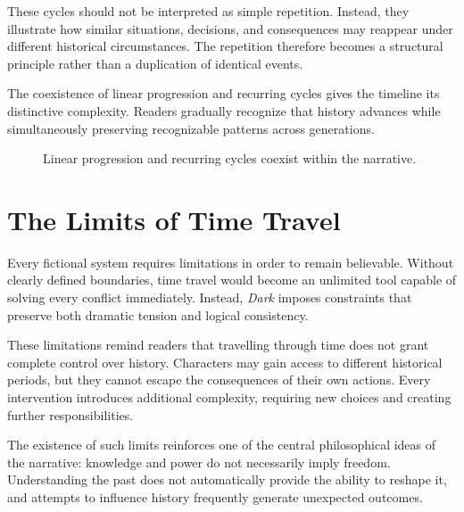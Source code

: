 \documentclass[12pt,oneside,openany]{book}
\begin{document}
These cycles should not be interpreted as simple repetition. Instead, they
illustrate how similar situations, decisions, and consequences may reappear
under different historical circumstances. The repetition therefore becomes a
structural principle rather than a duplication of identical events.

The coexistence of linear progression and recurring cycles gives the timeline
its distinctive complexity. Readers gradually recognize that history advances
while simultaneously preserving recognizable patterns across generations.

\begin{figure}[H]
\centering
{}

\caption{Linear progression and recurring cycles coexist within the narrative.}
\end{figure}
\section{The Limits of Time Travel}

Every fictional system requires limitations in order to remain believable.
Without clearly defined boundaries, time travel would become an unlimited tool
capable of solving every conflict immediately. Instead, \textit{Dark} imposes
constraints that preserve both dramatic tension and logical consistency.

These limitations remind readers that travelling through time does not grant
complete control over history. Characters may gain access to different
historical periods, but they cannot escape the consequences of their own
actions. Every intervention introduces additional complexity, requiring new
choices and creating further responsibilities.

The existence of such limits reinforces one of the central philosophical ideas
of the narrative: knowledge and power do not necessarily imply freedom.
Understanding the past does not automatically provide the ability to reshape
it, and attempts to influence history frequently generate unexpected outcomes.
\end{document}
